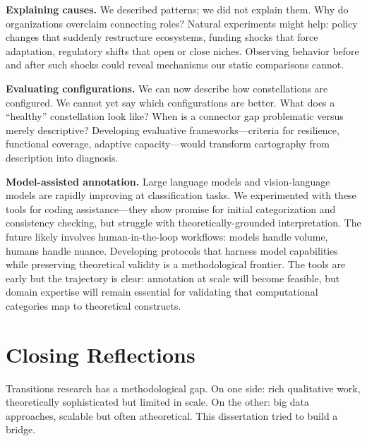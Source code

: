 \documentclass[../main.tex]{subfiles}
\begin{document}
\textbf{Explaining causes.} We described patterns; we did not explain them. Why do organizations overclaim connecting roles? Natural experiments might help: policy changes that suddenly restructure ecosystems, funding shocks that force adaptation, regulatory shifts that open or close niches. Observing behavior before and after such shocks could reveal mechanisms our static comparisons cannot.

\textbf{Evaluating configurations.} We can now describe how constellations are configured. We cannot yet say which configurations are better. What does a ``healthy'' constellation look like? When is a connector gap problematic versus merely descriptive? Developing evaluative frameworks---criteria for resilience, functional coverage, adaptive capacity---would transform cartography from description into diagnosis.

\textbf{Model-assisted annotation.} Large language models and vision-language models are rapidly improving at classification tasks. We experimented with these tools for coding assistance---they show promise for initial categorization and consistency checking, but struggle with theoretically-grounded interpretation. The future likely involves human-in-the-loop workflows: models handle volume, humans handle nuance. Developing protocols that harness model capabilities while preserving theoretical validity is a methodological frontier. The tools are early but the trajectory is clear: annotation at scale will become feasible, but domain expertise will remain essential for validating that computational categories map to theoretical constructs.

\section{Closing Reflections}

Transitions research has a methodological gap. On one side: rich qualitative work, theoretically sophisticated but limited in scale. On the other: big data approaches, scalable but often atheoretical. This dissertation tried to build a bridge.
\end{document}
